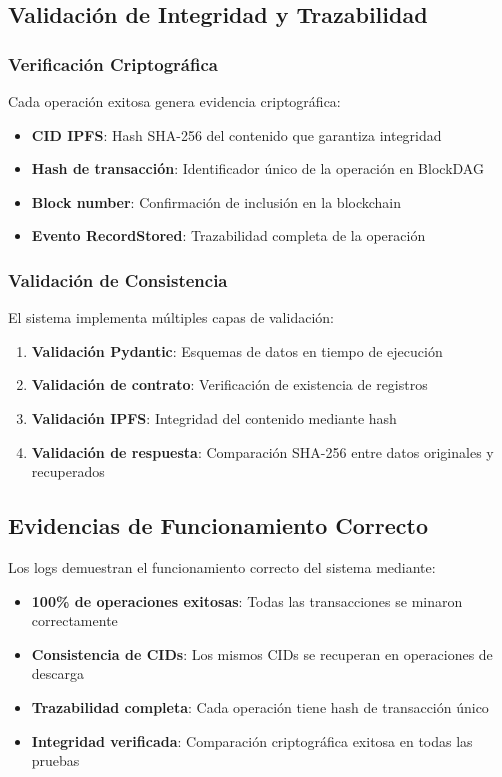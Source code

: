 \documentclass[onecolumn]{article}
\begin{document}
\subsection{Validación de Integridad y Trazabilidad}

\subsubsection{Verificación Criptográfica}

Cada operación exitosa genera evidencia criptográfica:

\begin{itemize}
    \item \textbf{CID IPFS}: Hash SHA-256 del contenido que garantiza integridad
    \item \textbf{Hash de transacción}: Identificador único de la operación en BlockDAG
    \item \textbf{Block number}: Confirmación de inclusión en la blockchain
    \item \textbf{Evento RecordStored}: Trazabilidad completa de la operación
\end{itemize}

\subsubsection{Validación de Consistencia}

El sistema implementa múltiples capas de validación:

\begin{enumerate}
    \item \textbf{Validación Pydantic}: Esquemas de datos en tiempo de ejecución
    \item \textbf{Validación de contrato}: Verificación de existencia de registros
    \item \textbf{Validación IPFS}: Integridad del contenido mediante hash
    \item \textbf{Validación de respuesta}: Comparación SHA-256 entre datos originales y recuperados
\end{enumerate}

\subsection{Evidencias de Funcionamiento Correcto}

Los logs demuestran el funcionamiento correcto del sistema mediante:

\begin{itemize}
    \item \textbf{100\% de operaciones exitosas}: Todas las transacciones se minaron correctamente
    \item \textbf{Consistencia de CIDs}: Los mismos CIDs se recuperan en operaciones de descarga
    \item \textbf{Trazabilidad completa}: Cada operación tiene hash de transacción único
    \item \textbf{Integridad verificada}: Comparación criptográfica exitosa en todas las pruebas
\end{itemize}
\end{document}

